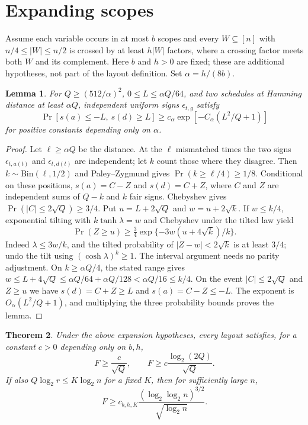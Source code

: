 \documentclass[11pt]{article}
\newtheorem{theorem}{Theorem}
\newtheorem{lemma}[theorem]{Lemma}
\begin{document}
\section{Expanding scopes}
Assume each variable occurs in at most $b$ scopes and every $W\subseteq[n]$ with $n/4\le |W|\le n/2$ is crossed by at least $h|W|$ factors, where a crossing factor meets both $W$ and its complement. Here $b$ and $h>0$ are fixed; these are additional hypotheses, not part of the layout definition. Set $\alpha=h/(8b)$.
\begin{lemma}\label{lem:prob}
For $Q\ge(512/\alpha)^2$, $0\le L\le\alpha Q/64$, and two schedules at Hamming distance at least $\alpha Q$, independent uniform signs $\epsilon_{t,g}$ satisfy
\[\Pr[s(a)\le-L,\ s(d)\ge L]\ge c_\alpha\exp[-C_\alpha(L^2/Q+1)]\]
for positive constants depending only on $\alpha$.
\end{lemma}
\begin{proof}
Let $\ell\ge\alpha Q$ be the distance. At the $\ell$ mismatched times the two signs $\epsilon_{t,a(t)}$ and $\epsilon_{t,d(t)}$ are independent; let $k$ count those where they disagree. Then $k\sim\mathrm{Bin}(\ell,1/2)$ and Paley--Zygmund gives $\Pr(k\ge\ell/4)\ge1/8$. Conditional on these positions, $s(a)=C-Z$ and $s(d)=C+Z$, where $C$ and $Z$ are independent sums of $Q-k$ and $k$ fair signs. Chebyshev gives $\Pr(|C|\le2\sqrt Q)\ge3/4$. Put $u=L+2\sqrt Q$ and $w=u+2\sqrt k$. If $w\le k/4$, exponential tilting with $k\tanh\lambda=w$ and Chebyshev under the tilted law yield
\[\Pr(Z\ge u)\ge\tfrac34\exp\{-3w(u+4\sqrt k)/k\}.\]
Indeed $\lambda\le3w/k$, and the tilted probability of $|Z-w|<2\sqrt k$ is at least $3/4$; undo the tilt using $(\cosh\lambda)^k\ge1$. The interval argument needs no parity adjustment. On $k\ge\alpha Q/4$, the stated range gives $w\le L+4\sqrt Q\le\alpha Q/64+\alpha Q/128<\alpha Q/16\le k/4$. On the event $|C|\le2\sqrt Q$ and $Z\ge u$ we have $s(d)=C+Z\ge L$ and $s(a)=C-Z\le-L$. The exponent is $O_\alpha(L^2/Q+1)$, and multiplying the three probability bounds proves the lemma.
\end{proof}
\begin{theorem}\label{thm:expand}
Under the above expansion hypotheses, every layout satisfies, for a constant $c>0$ depending only on $b,h$,
\[F\ge \frac c{\sqrt Q},\qquad F\ge c\frac{\log_2(2Q)}{\sqrt Q}.\]
If also $Q\log_2 r\le K\log_2 n$ for a fixed $K$, then for sufficiently large $n$,
\[F\ge c_{b,h,K}\frac{(\log_2\log_2 n)^{3/2}}{\sqrt{\log_2 n}}.\]
\end{theorem}
\end{document}
